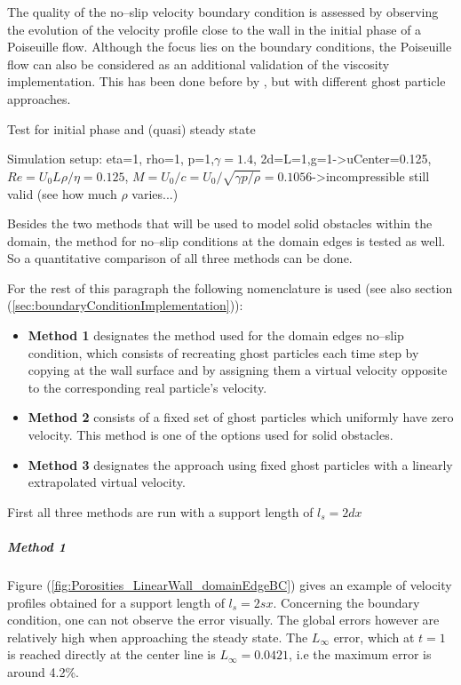 \documentclass{report}
\begin{document}
The quality of the no--slip velocity boundary condition is assessed by observing the evolution of the velocity profile close to the wall in the initial phase of a Poiseuille flow. Although the focus lies on the boundary conditions, the Poiseuille flow can also be considered as an additional validation of the viscosity implementation. This has been done before by \cite{Basa2009}, but with different ghost particle approaches.



Test for initial phase and (quasi) steady state

Simulation setup: eta=1, rho=1, p=1,$\gamma=1.4$, 2d=L=1,g=1->uCenter=0.125, $Re=U_0 L \rho/\eta=0.125$, $M=U_0/c=U_0/\sqrt{\gamma p/\rho}=0.1056$->incompressible still valid (see how much $\rho$ varies...)

Besides the two methods that will be used to model solid obstacles within the domain, the method for no--slip conditions at the domain edges is tested as well. So a quantitative comparison of all three methods can be done.

For the rest of this paragraph the following nomenclature is used (see also section (\ref{sec:boundaryConditionImplementation})):
\begin{itemize}
 \item {\bf Method 1} designates the method used for the domain edges no--slip condition, which consists of recreating ghost particles each time step by copying at the wall surface and  by assigning them a virtual velocity opposite to the corresponding real particle's velocity.
\item {\bf Method 2} consists of a fixed set of ghost particles which uniformly have zero velocity. This method is one of the options used for solid obstacles.
\item {\bf Method 3} designates the approach using fixed ghost particles with a linearly extrapolated virtual velocity.
\end{itemize}

First all three methods are run with a support length of $l_s=2dx$



\subparagraph{Method 1}


Figure (\ref{fig:Porosities_LinearWall_domainEdgeBC}) gives an example of velocity profiles obtained for a support length of $l_s=2sx$. Concerning the boundary condition, one can not observe the error visually.
The global errors however are relatively high when approaching the steady state. The $L_\infty$ error, which at $t=1$ is reached directly at the center line is $L_\infty=0.0421$, i.e the maximum error is around 4.2\%. 
\end{document}
